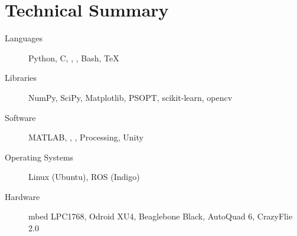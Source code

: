 \documentclass{simplecv}
\begin{document}
\maketitle
\vfill
\section{Technical Summary}
\begin{minipage}{\textwidth}
\begin{description}
\item[Languages]
    Python,
    C,
    \CPP,
    \CSharp,
    Bash,
    \TeX

\item[Libraries]
    NumPy,
    SciPy,
    Matplotlib,
    PSOPT,
    scikit-learn,
    opencv 

\item[Software]
    MATLAB,
  ,
  ,
  Processing,
  Unity

\item[Operating Systems]
    Linux (Ubuntu),
    ROS (Indigo)
\item[Hardware]
    mbed LPC1768,
    Odroid XU4,
    Beaglebone Black,
    AutoQuad 6,
    CrazyFlie 2.0
\end{description}
\end{minipage}

\vfill
\end{document}
